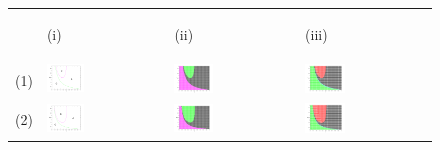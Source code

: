 \documentclass[12pt]{UOthesis}
\theoremstyle{remarkstyle}
\begin{document}
\begin{figure}[h!]
	\centering
	\begin{tabular}{m{0.07cm} m{4.5cm}  m{4.5cm}  m{4.5cm}}
		& \begin{center}
			(i)
		\end{center} & \begin{center}
			(ii)
		\end{center} & \begin{center}
			(iii)
		\end{center}\\
		(1) & \includegraphics[width=0.33\textwidth]{HLOOwlSimpPOMutualInvasion1.png} & \includegraphics[width=0.33\textwidth]{HLOOwlSimpPOSteadyState1.png} & \includegraphics[width=0.33\textwidth]{HLOOwlSimpPOEigenvalues1.png}\\
		
		(2) & \includegraphics[width=0.33\textwidth]{HLOOwlSimpPOMutualInvasion2.png} & \includegraphics[width=0.33\textwidth]{HLOOwlSimpPOSteadyState2.png} & \includegraphics[width=0.33\textwidth]{HLOOwlSimpPOEigenvalues2.png}\\
		

\end{tabular}
\end{figure}
\end{document}

